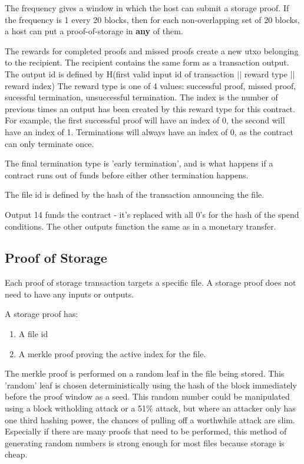 \documentclass[twocolumn]{article}
\begin{document}
The frequency gives a window in which the host can submit a storage proof.
If the frequency is 1 every 20 blocks, then for each non-overlapping set of 20 blocks, a host can put a proof-of-storage in \textbf{any} of them.

The rewards for completed proofs and missed proofs create a new utxo belonging to the recipient.
The recipient contains the same form as a transaction output.
The output id is defined by H(first valid input id of transaction $||$ reward type $||$ reward index)
The reward type is one of 4 values: successful proof, missed proof, sucessful termination, unsuccessful termination.
The index is the number of previous times an output has been created by this reward type for this contract.
For example, the first successful proof will have an index of 0, the second will have an index of 1.
Terminations will always have an index of 0, as the contract can only terminate once.

The final termination type is 'early termination', and is what happens if a contract runs out of funds before either other termination happens.

The file id is defined by the hash of the transaction announcing the file.

Output 14 funds the contract - it's replaced with all 0's for the hash of the spend conditions.
The other outputs function the same as in a monetary transfer.

\subsection{Proof of Storage}
Each proof of storage transaction targets a specific file.
A storage proof does not need to have any inputs or outputs.

A storage proof has:
\begin{enumerate}
	\item A file id
	\item A merkle proof proving the active index for the file.
\end{enumerate}

The merkle proof is performed on a random leaf in the file being stored.
This 'random' leaf is chosen deterministically using the hash of the block immediately before the proof window as a seed.
This random number could be manipulated using a block witholding attack or a 51\% attack, but where an attacker only has one third hashing power, the chances of pulling off a worthwhile attack are slim.
Especially if there are many proofs that need to be performed, this method of generating random numbers is strong enough for most files because storage is cheap.
\end{document}
